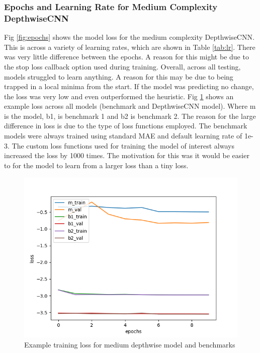 \subsubsection*{Epochs and Learning Rate for Medium Complexity DepthwiseCNN}
Fig \ref{fig:epochs} shows the model loss for the medium complexity DepthwiseCNN. This is across a variety of learning rates, which are shown in Table \ref{tab:lr}. There was very little difference between the epochs. A reason for this might be due to the stop loss callback option used during training. Overall, across all testing, models struggled to learn anything. A reason for this may be due to being trapped in a local minima from the start. If the model was predicting no change, the loss was very low and even outperformed the heuristic. Fig \ref{fig:egloss-epochs} shows an example loss across all models (benchmark and DepthwiseCNN model). Where m is the model, b1, is benchmark 1 and b2 is benchmark 2. The reason for the large difference in loss is due to the type of loss functions employed. The benchmark models were always trained using standard MAE and default learning rate of 1e-3. The custom loss functions used for training the model of interest always increased the loss by 1000 times. The motivation for this was it would be easier to for the model to learn from a larger loss than a tiny loss.

\begin{figure}[tbph]
	\centering
	\includegraphics[width=0.9\linewidth, height=0.3\textheight]{Figures/Results/Diff_Complexity_Lr_Epochs/Epochs_Lr/medium_depthwise_diff_train_2_custom_mae_weighted_2e-3_more_epochs_norm_independant_292_training}
	\caption[Example Loss for Medium depthwise model and benchmarks]{Example training loss for medium depthwise model and benchmarks}
	\label{fig:egloss-epochs}
\end{figure}


